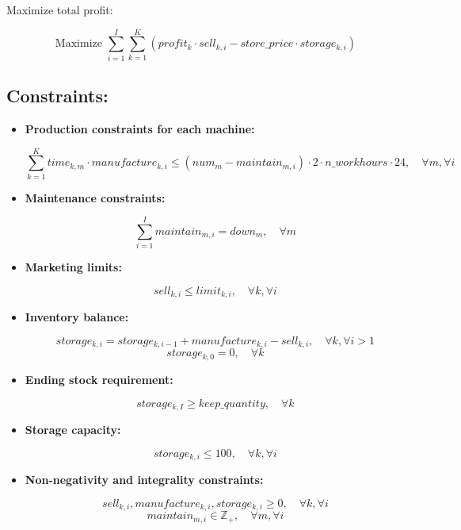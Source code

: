 \documentclass{article}
\begin{document}
Maximize total profit:

\[
\text{Maximize } \sum_{i=1}^{I} \sum_{k=1}^{K} \left( profit_{k} \cdot sell_{k,i} - store\_price \cdot storage_{k,i} \right)
\]

\subsection*{Constraints:}

\begin{itemize}
    \item \textbf{Production constraints for each machine:}

    \[
    \sum_{k=1}^{K} time_{k,m} \cdot manufacture_{k,i} \leq \left(num_{m} - maintain_{m,i}\right) \cdot 2 \cdot n\_workhours \cdot 24, \quad \forall m, \forall i
    \]

    \item \textbf{Maintenance constraints:}

    \[
    \sum_{i=1}^{I} maintain_{m,i} = down_{m}, \quad \forall m
    \]

    \item \textbf{Marketing limits:}

    \[
    sell_{k,i} \leq limit_{k,i}, \quad \forall k, \forall i
    \]

    \item \textbf{Inventory balance:}

    \[
    storage_{k,i} = storage_{k,i-1} + manufacture_{k,i} - sell_{k,i}, \quad \forall k, \forall i > 1
    \]
    \[
    storage_{k,0} = 0, \quad \forall k
    \]

    \item \textbf{Ending stock requirement:}

    \[
    storage_{k,I} \geq keep\_quantity, \quad \forall k
    \]

    \item \textbf{Storage capacity:}

    \[
    storage_{k,i} \leq 100, \quad \forall k, \forall i
    \]

    \item \textbf{Non-negativity and integrality constraints:}

    \[
    sell_{k,i}, manufacture_{k,i}, storage_{k,i} \geq 0, \quad \forall k, \forall i
    \]
    \[
    maintain_{m,i} \in \mathbb{Z}_+, \quad \forall m, \forall i
    \]
\end{itemize}
\end{document}
